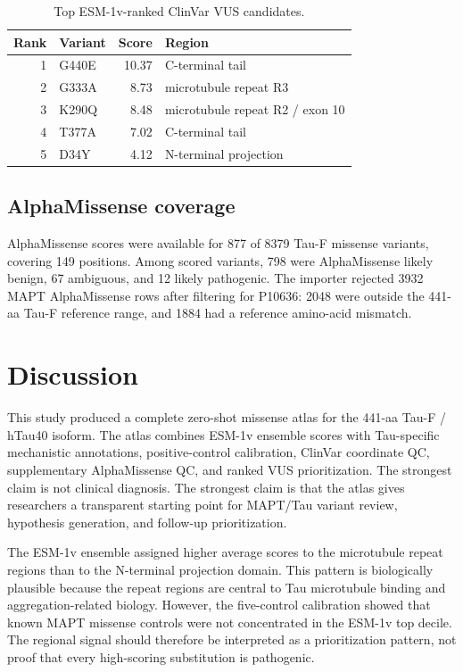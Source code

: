 \documentclass[11pt]{article}
\begin{document}
\begin{table}[H]
\centering
\caption{Top ESM-1v-ranked ClinVar VUS candidates.}
\label{tab:vus}
\begin{tabular}{rlrl}
\toprule
Rank & Variant & Score & Region \\
\midrule
1 & G440E & 10.37 & C-terminal tail \\
2 & G333A & 8.73 & microtubule repeat R3 \\
3 & K290Q & 8.48 & microtubule repeat R2 / exon 10 \\
4 & T377A & 7.02 & C-terminal tail \\
5 & D34Y & 4.12 & N-terminal projection \\
\bottomrule
\end{tabular}
\end{table}

\subsection{AlphaMissense coverage}

AlphaMissense scores were available for 877 of 8379 Tau-F missense variants,
covering 149 positions. Among scored variants, 798 were AlphaMissense likely
benign, 67 ambiguous, and 12 likely pathogenic. The importer rejected 3932 MAPT
AlphaMissense rows after filtering for P10636: 2048 were outside the 441-aa
Tau-F reference range, and 1884 had a reference amino-acid mismatch.

\section{Discussion}

This study produced a complete zero-shot missense atlas for the 441-aa Tau-F /
hTau40 isoform. The atlas combines ESM-1v ensemble scores with Tau-specific
mechanistic annotations, positive-control calibration, ClinVar coordinate QC,
supplementary AlphaMissense QC, and ranked VUS prioritization. The strongest claim
is not clinical diagnosis. The strongest claim is that the atlas gives researchers
a transparent starting point for MAPT/Tau variant review, hypothesis generation,
and follow-up prioritization.

The ESM-1v ensemble assigned higher average scores to the microtubule repeat
regions than to the N-terminal projection domain. This pattern is biologically
plausible because the repeat regions are central to Tau microtubule binding and
aggregation-related biology. However, the five-control calibration showed that
known MAPT missense controls were not concentrated in the ESM-1v top decile. The
regional signal should therefore be interpreted as a prioritization pattern, not
proof that every high-scoring substitution is pathogenic.
\end{document}
